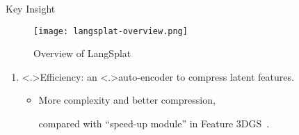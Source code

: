 \begin{Frame}{Key Insight}
	\begin{figure}[htbp]
		\centering
		\begin{annotatedFigureEnv}
			{\texttt{[image: langsplat-overview.png]}}
		\end{annotatedFigureEnv}
		\vspace*{0.5ex}
		\addtocounter{figure}{-1}
		\caption{Overview of LangSplat}
	\end{figure}
	\vspace*{\fill}
	\begin{enumerate}[<+->]
		\setlength{\itemsep}{1.5ex}
		\setcounter{enumi}{1}
		\item \alert<.>{Efficiency:} an \alert<.>{auto-encoder} to compress latent features.
		      \vspace*{1.5ex}
		      \begin{itemize}
			      \setlength{\itemsep}{1.5ex}
			      \item More complexity and better compression,
			            \vspace*{1.5ex}
			            \par compared with ``speed-up module'' in Feature 3DGS~\autocite{zhouFeature3DGSSupercharging2024apr}.
		      \end{itemize}
	\end{enumerate}
\end{Frame}

